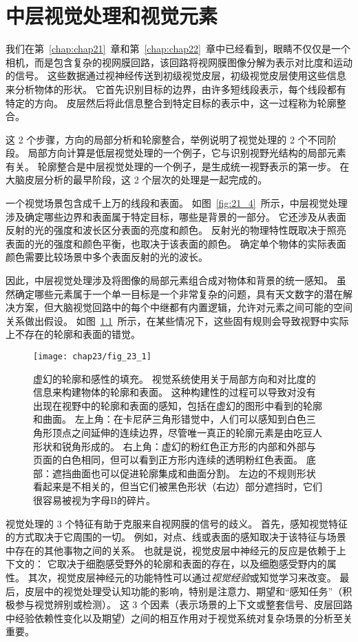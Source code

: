 \chapter{中层视觉处理和视觉元素} \label{chap:chap23}

我们在第~\ref{chap:chap21}~章和第~\ref{chap:chap22}~章中已经看到，眼睛不仅仅是一个相机，而是包含复杂的视网膜回路，该回路将视网膜图像分解为表示对比度和运动的信号。
这些数据通过视神经传送到初级视觉皮层，初级视觉皮层使用这些信息来分析物体的形状。
它首先识别目标的边界，由许多短线段表示，每个线段都有特定的方向。
皮层然后将此信息整合到特定目标的表示中，这一过程称为轮廓整合。


这 2 个步骤，方向的局部分析和轮廓整合，举例说明了视觉处理的 2 个不同阶段。
局部方向计算是低层视觉处理的一个例子，它与识别视野光结构的局部元素有关。
轮廓整合是中层视觉处理的一个例子，是生成统一视野表示的第一步。
在大脑皮层分析的最早阶段，这 2 个层次的处理是一起完成的。
 

一个视觉场景包含成千上万的线段和表面。
如图~\ref{fig:21_4}~所示，中层视觉处理涉及确定哪些边界和表面属于特定目标，哪些是背景的一部分。
它还涉及从表面反射的光的强度和波长区分表面的亮度和颜色。
反射光的物理特性既取决于照亮表面的光的强度和颜色平衡，也取决于该表面的颜色。
确定单个物体的实际表面颜色需要比较场景中多个表面反射的光的波长。


因此，中层视觉处理涉及将图像的局部元素组合成对物体和背景的统一感知。
虽然确定哪些元素属于一个单一目标是一个非常复杂的问题，具有天文数字的潜在解决方案，但大脑视觉回路中的每个中继都有内置逻辑，允许对元素之间可能的空间关系做出假设。
如图~\ref{fig:23_1}~所示，在某些情况下，这些固有规则会导致视野中实际上不存在的轮廓和表面的错觉。


\begin{figure}[htbp]
	\centering
	\texttt{[image: chap23/fig\_23\_1]}
	\caption{虚幻的轮廓和感性的填充。
		视觉系统使用关于局部方向和对比度的信息来构建物体的轮廓和表面。
		这种构建性的过程可以导致对没有出现在视野中的轮廓和表面的感知，包括在虚幻的图形中看到的轮廓和曲面。
		左上角：在卡尼萨三角形错觉中，人们可以感知到白色三角形顶点之间延伸的连续边界，尽管唯一真正的轮廓元素是由吃豆人形状和锐角形成的。
		右上角：虚幻的粉红色正方形的内部和外部与页面的白色相同，但可以看到正方形内连续的透明粉红色表面。
		底部：遮挡曲面也可以促进轮廓集成和曲面分割。
		左边的不规则形状看起来是不相关的，但当它们被黑色形状（右边）部分遮挡时，它们很容易被视为字母B的碎片。}
	\label{fig:23_1}
\end{figure}


视觉处理的 3 个特征有助于克服来自视网膜的信号的歧义。
首先，感知视觉特征的方式取决于它周围的一切。
例如，对点、线或表面的感知取决于该特征与场景中存在的其他事物之间的关系。
也就是说，视觉皮层中神经元的反应是依赖于上下文的：
它取决于细胞感受野外的轮廓和表面的存在，以及细胞感受野内的属性。
其次，视觉皮层神经元的功能特性可以通过\textit{视觉经验}或知觉学习来改变。
最后，皮层中的视觉处理受认知功能的影响，特别是注意力、期望和“感知任务”（积极参与视觉辨别或检测）。
这 3 个因素（表示场景的上下文或整套信号、皮层回路中经验依赖性变化以及期望）之间的相互作用对于视觉系统对复杂场景的分析至关重要。


